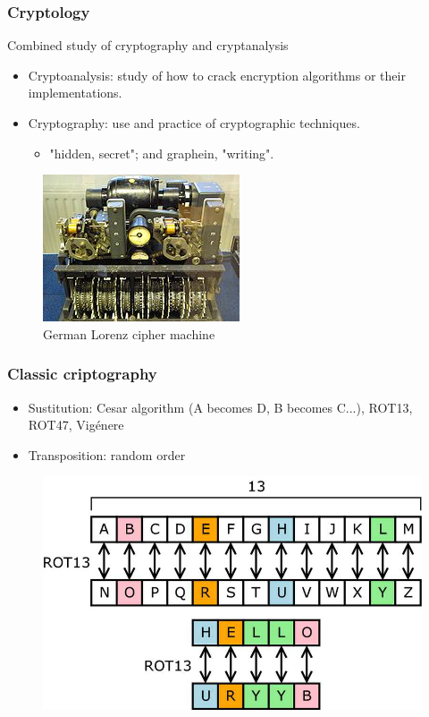 \documentclass{beamer}
\begin{document}
\begin{frame}
\frametitle{Cryptology}
Combined study of cryptography and cryptanalysis
\begin{itemize}
\item Cryptoanalysis: study of how to crack encryption algorithms or their implementations.
\item Cryptography: use and practice of cryptographic techniques.
\begin{itemize}
\item "hidden, secret"; and graphein, "writing".
\end{itemize}
\end{itemize}
\begin{figure}
\includegraphics[width=0.3\linewidth]{ww2.jpg}
\caption{German Lorenz cipher machine}
\label{F:German Lorenz cipher machine}
\end{figure}
\end{frame}

\begin{frame}
\frametitle{Classic criptography}
\begin{itemize}
\item Sustitution: Cesar algorithm (A becomes D, B becomes C...), ROT13, ROT47, Vigénere 
\item Transposition: random order
\end{itemize}
\begin{figure}
\includegraphics[width=0.6\linewidth]{rot13.png}
\end{figure}
\end{frame}
\end{document}
